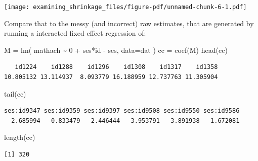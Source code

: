 \documentclass[
  letterpaper,
  DIV=11,
  numbers=noendperiod]{scrreprt}
\newenvironment{Shaded}{}{}
\newcommand{\AttributeTok}[1]{\textcolor[rgb]{0.49,0.56,0.16}{#1}}
\newcommand{\DecValTok}[1]{\textcolor[rgb]{0.25,0.63,0.44}{#1}}
\newcommand{\FunctionTok}[1]{\textcolor[rgb]{0.02,0.16,0.49}{#1}}
\newcommand{\NormalTok}[1]{#1}
\newcommand{\OtherTok}[1]{\textcolor[rgb]{0.00,0.44,0.13}{#1}}
\newcommand{\SpecialCharTok}[1]{\textcolor[rgb]{0.25,0.44,0.63}{#1}}
\begin{document}
\begin{center}
\texttt{[image: examining\_shrinkage\_files/figure-pdf/unnamed-chunk-6-1.pdf]}
\end{center}

Compare that to the messy (and incorrect) raw estimates, that are
generated by running a interacted fixed effect regression of:

\begin{Shaded}
\begin{Highlighting}[]
\NormalTok{M }\OtherTok{=} \FunctionTok{lm}\NormalTok{( mathach }\SpecialCharTok{\textasciitilde{}} \DecValTok{0} \SpecialCharTok{+}\NormalTok{ ses}\SpecialCharTok{*}\NormalTok{id }\SpecialCharTok{{-}}\NormalTok{ ses, }\AttributeTok{data=}\NormalTok{dat )}
\NormalTok{cc }\OtherTok{=} \FunctionTok{coef}\NormalTok{(M)}
\FunctionTok{head}\NormalTok{(cc)}
\end{Highlighting}
\end{Shaded}

\begin{verbatim}
   id1224    id1288    id1296    id1308    id1317    id1358 
10.805132 13.114937  8.093779 16.188959 12.737763 11.305904 
\end{verbatim}

\begin{Shaded}
\begin{Highlighting}[]
\FunctionTok{tail}\NormalTok{(cc)}
\end{Highlighting}
\end{Shaded}

\begin{verbatim}
ses:id9347 ses:id9359 ses:id9397 ses:id9508 ses:id9550 ses:id9586 
  2.685994  -0.833479   2.446444   3.953791   3.891938   1.672081 
\end{verbatim}

\begin{Shaded}
\begin{Highlighting}[]
\FunctionTok{length}\NormalTok{(cc)}
\end{Highlighting}
\end{Shaded}

\begin{verbatim}
[1] 320
\end{verbatim}
\end{document}
